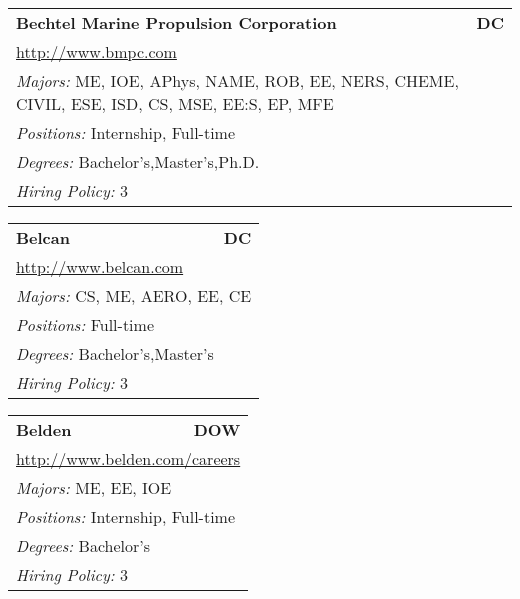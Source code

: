 \documentclass[twoside]{article}
\begin{document}
\begin{center}
\begin{multicols}{3}
\begin{FlushLeft}
\begin{minipage}{.9\columnwidth}
\end{minipage}
 
\begin{minipage}{.9\columnwidth}\begin{tabularx}{.95\columnwidth}{Xr}
                 {\Large\bf Bechtel Marine Propulsion Corporation} & {\Large\bf DC}\\
    \multicolumn{2}{p{.95\columnwidth}}{\url{http://www.bmpc.com}}\\
    \multicolumn{2}{p{.95\columnwidth}}{\emph{Majors:} ME, IOE, APhys, NAME, ROB, EE, NERS, CHEME, CIVIL, ESE, ISD, CS, MSE, EE:S, EP, MFE}\\
    \multicolumn{2}{p{.95\columnwidth}}{\emph{Positions:} Internship, Full-time}\\
    \multicolumn{2}{p{.95\columnwidth}}{\emph{Degrees:} Bachelor's,Master's,Ph.D.}\\
    \multicolumn{2}{p{.95\columnwidth}}{\emph{Hiring Policy:} 3}\\
    \end{tabularx}
    
\end{minipage}
 
\begin{minipage}{.9\columnwidth}\begin{tabularx}{.95\columnwidth}{Xr}
                 {\Large\bf Belcan} & {\Large\bf DC}\\
    \multicolumn{2}{p{.95\columnwidth}}{\url{http://www.belcan.com}}\\
    \multicolumn{2}{p{.95\columnwidth}}{\emph{Majors:} CS, ME, AERO, EE, CE}\\
    \multicolumn{2}{p{.95\columnwidth}}{\emph{Positions:} Full-time}\\
    \multicolumn{2}{p{.95\columnwidth}}{\emph{Degrees:} Bachelor's,Master's}\\
    \multicolumn{2}{p{.95\columnwidth}}{\emph{Hiring Policy:} 3}\\
    \end{tabularx}
    
\end{minipage}
 
\begin{minipage}{.9\columnwidth}\begin{tabularx}{.95\columnwidth}{Xr}
                 {\Large\bf Belden} & {\Large\bf DOW}\\
    \multicolumn{2}{p{.95\columnwidth}}{\url{http://www.belden.com/careers}}\\
    \multicolumn{2}{p{.95\columnwidth}}{\emph{Majors:} ME, EE, IOE}\\
    \multicolumn{2}{p{.95\columnwidth}}{\emph{Positions:} Internship, Full-time}\\
    \multicolumn{2}{p{.95\columnwidth}}{\emph{Degrees:} Bachelor's}\\
    \multicolumn{2}{p{.95\columnwidth}}{\emph{Hiring Policy:} 3}\\
    \end{tabularx}
    

\end{minipage}
\end{FlushLeft}
\end{multicols}
\end{center}
\end{document}
